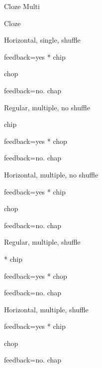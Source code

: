 \documentclass{article}
\begin{document}
\begin{quiz}{Cloze Multi}
\begin{cloze}{Cloze}
\begin{multi}[shuffle=true,horizontal]
	Horizontal, single, shuffle
	\item[feedback={yes}]* chip
	\item chop
	\item[feedback={no.}] chap
\end{multi}

\begin{multi}[multiple,shuffle=false]
	Regular, multiple, no shuffle
	\item* chip
	\item[feedback={yes}]* chop
	\item[feedback={no.}] chap
\end{multi}


\begin{multi}[multiple,shuffle=false,horizontal]
	Horizontal, multiple, no shuffle
	\item[feedback={yes}]* chip
	\item* chop
	\item[feedback={no.}] chap
\end{multi}

\begin{multi}[multiple,shuffle=true]
	Regular, multiple, shuffle
	\item[]* chip
	\item[feedback={yes}]* chop
	\item[feedback={no.}] chap
\end{multi}
%
%
\begin{multi}[multiple,shuffle=true,horizontal]
	Horizontal, multiple, shuffle
	\item[feedback={yes}]* chip
	\item* chop
	\item[feedback={no.}] chap
\end{multi}

\end{cloze}

\end{quiz}
\end{document}
